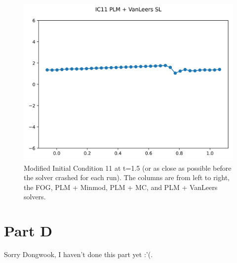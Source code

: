 \documentclass{article}
\begin{document}
\begin{figure}[t]
    \emp
        \centering
        \includegraphics[width=.95\textwidth]{../../code/pc_IC11Methodpv_plot.png}
    \emp
    \caption{Modified Initial Condition 11 at t=1.5 (or as close as possible before the
    solver crashed for each run). The columns are from left to right, the FOG,
    PLM + Minmod, PLM + MC, and PLM + VanLeers solvers.}
    \label{fig:pc_sol}
\end{figure}


\section{Part D}
    Sorry Dongwook, I haven't done this part yet :'(. 
\end{document}
